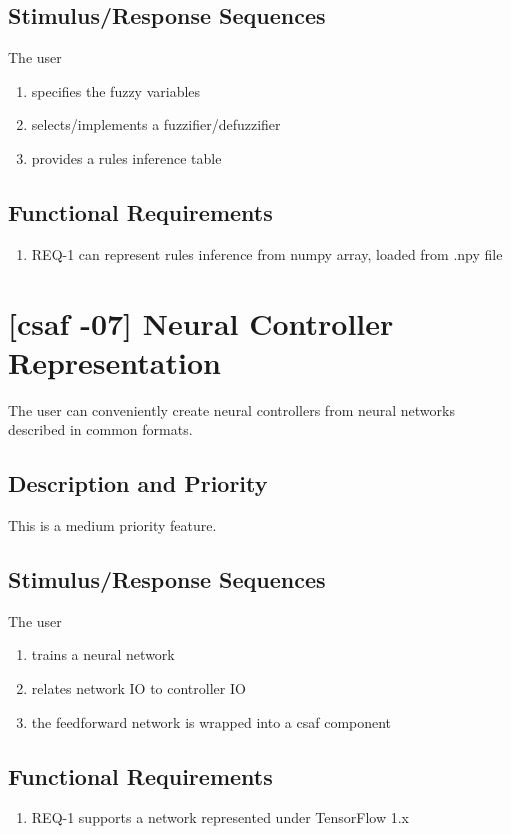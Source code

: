 \subsection{Stimulus/Response Sequences}
The user
\begin{enumerate}
\item specifies the fuzzy variables
\item selects/implements a fuzzifier/defuzzifier
\item provides a rules inference table
\end{enumerate}

\subsection{Functional Requirements}

\begin{enumerate}
\item REQ-1 \quad can represent rules inference from numpy array, loaded from .npy file
\end{enumerate}


\section{[\acrshort{csaf} -07] Neural Controller Representation}
The user can conveniently create neural controllers from neural networks described in common formats.

\subsection{Description and Priority}
This is a medium priority feature.

\subsection{Stimulus/Response Sequences}
The user
\begin{enumerate}
\item trains a neural network
\item relates network IO to controller IO
\item the feedforward network is wrapped into a \acrshort{csaf}  component
\end{enumerate}

\subsection{Functional Requirements}
\begin{enumerate}
\item REQ-1 \quad supports a network represented under TensorFlow 1.x
\end{enumerate}

